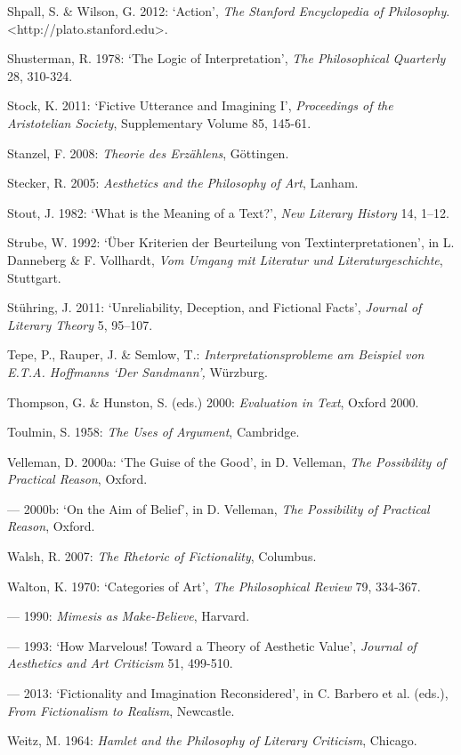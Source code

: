 \begin{hangparas}{.5cm}{1}
Shpall, S. \& Wilson, G. 2012: `Action', \emph{The Stanford Encyclopedia of Philosophy}. \textless{}http://plato.stanford.edu\textgreater{}.

Shusterman, R. 1978: `The Logic of Interpretation', \emph{The Philosophical Quarterly} 28, 310-324.

Stock, K. 2011: `Fictive Utterance and Imagining I', \emph{Proceedings of the Aristotelian Society}, Supplementary Volume 85, 145-61.

Stanzel, F. 2008: \emph{Theorie des Erz\"ahlens}, G\"ottingen. 

Stecker, R. 2005: \emph{Aesthetics and the Philosophy of Art}, Lanham.

Stout, J. 1982: `What is the Meaning of a Text?', \emph{New Literary History} 14, 1--12.

Strube, W. 1992: `\"Uber Kriterien der Beurteilung von Textinterpretationen', in L. Danneberg \& F. Vollhardt, \emph{Vom Umgang mit Literatur und Literaturgeschichte}, Stuttgart.

St\"uhring, J. 2011: `Unreliability, Deception, and Fictional Facts', \emph{Journal of Literary Theory} 5, 95--107.

Tepe, P., Rauper, J. \& Semlow, T.: \emph{Interpretationsprobleme am Beispiel von E.T.A. Hoffmanns `Der Sandmann',} W\"urzburg.

Thompson, G. \& Hunston, S. (eds.) 2000: \emph{Evaluation in Text}, Oxford 2000.

Toulmin, S. 1958: \emph{The Uses of Argument}, Cambridge.

Velleman, D. 2000a: `The Guise of the Good', in D. Velleman, \emph{The Possibility of Practical Reason}, Oxford.

--- 2000b: `On the Aim of Belief', in D. Velleman, \emph{The Possibility of Practical Reason}, Oxford.

Walsh, R. 2007: \emph{The Rhetoric of Fictionality}, Columbus.

Walton, K. 1970: `Categories of Art', \emph{The Philosophical Review} 79, 334-367.

--- 1990: \emph{Mimesis as Make-Believe}, Harvard.

--- 1993: `How Marvelous! Toward a Theory of Aesthetic Value', \emph{Journal of Aesthetics and Art Criticism} 51, 499-510.

--- 2013: `Fictionality and Imagination Reconsidered', in C. Barbero et al. (eds.), \emph{From Fictionalism to Realism}, Newcastle.

Weitz, M. 1964: \emph{Hamlet and the Philosophy of Literary Criticism}, Chicago.


\end{hangparas}
